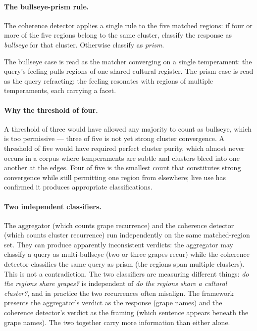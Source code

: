 \documentclass[11pt]{article}
\begin{document}
\paragraph{The bullseye-prism rule.}
The coherence detector applies a single rule to the five matched regions: if four or more of the five regions belong to the same cluster, classify the response as \emph{bullseye} for that cluster. Otherwise classify as \emph{prism}.

The bullseye case is read as the matcher converging on a single temperament: the query's feeling pulls regions of one shared cultural register. The prism case is read as the query refracting: the feeling resonates with regions of multiple temperaments, each carrying a facet.

\paragraph{Why the threshold of four.}
A threshold of three would have allowed any majority to count as bullseye, which is too permissive --- three of five is not yet strong cluster convergence. A threshold of five would have required perfect cluster purity, which almost never occurs in a corpus where temperaments are subtle and clusters bleed into one another at the edges. Four of five is the smallest count that constitutes strong convergence while still permitting one region from elsewhere; live use has confirmed it produces appropriate classifications.

\paragraph{Two independent classifiers.}
The aggregator (which counts grape recurrence) and the coherence detector (which counts cluster recurrence) run independently on the same matched-region set. They can produce apparently inconsistent verdicts: the aggregator may classify a query as multi-bullseye (two or three grapes recur) while the coherence detector classifies the same query as prism (the regions span multiple clusters). This is not a contradiction. The two classifiers are measuring different things: \emph{do the regions share grapes?} is independent of \emph{do the regions share a cultural cluster?}, and in practice the two recurrences often misalign. The framework presents the aggregator's verdict as the response (grape names) and the coherence detector's verdict as the framing (which sentence appears beneath the grape names). The two together carry more information than either alone.
\end{document}
